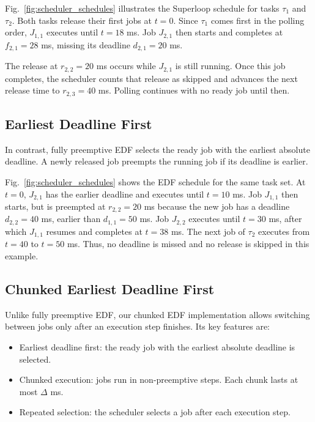 \documentclass[conference]{IEEEtran}
\begin{document}
Fig.~\ref{fig:scheduler_schedules} illustrates the Superloop schedule for tasks $\tau_1$ and $\tau_2$. Both tasks release their first jobs at $t=0$. Since $\tau_1$ comes first in the polling order, $J_{1,1}$ executes until $t=18$ ms. Job $J_{2,1}$ then starts and completes at $f_{2,1}=28$ ms, missing its deadline $d_{2,1}=20$ ms.

The release at $r_{2,2}=20$ ms occurs while $J_{2,1}$ is still running. Once this job completes, the scheduler counts that release as skipped and advances the next release time to $r_{2,3}=40$ ms. Polling continues with no ready job until then.

\subsection{Earliest Deadline First}
\label{EDF_subsection}

In contrast, fully preemptive EDF selects the ready job with the earliest absolute deadline. A newly released job preempts the running job if its deadline is earlier.

Fig.~\ref{fig:scheduler_schedules} shows the EDF schedule for the same task set. At $t=0$, $J_{2,1}$ has the earlier deadline and executes until $t=10$ ms. Job $J_{1,1}$ then starts, but is preempted at $r_{2,2}=20$ ms because the new job has a deadline $d_{2,2}=40$ ms, earlier than $d_{1,1}=50$ ms. Job $J_{2,2}$ executes until $t=30$ ms, after which $J_{1,1}$ resumes and completes at $t=38$ ms. The next job of $\tau_2$ executes from $t=40$ to $t=50$ ms. Thus, no deadline is missed and no release is skipped in this example.


\subsection{Chunked Earliest Deadline First}
\label{chunked_EDF_subsection}

Unlike fully preemptive EDF, our chunked EDF implementation allows switching between jobs only after an execution step finishes. Its key features are:
%
\begin{itemize}
	\item Earliest deadline first: the ready job with the earliest absolute deadline is selected.
	\item Chunked execution: jobs run in non-preemptive steps. Each chunk lasts at most $\Delta$ ms.
	\item Repeated selection: the scheduler selects a job after each execution step.
\end{itemize}
\end{document}
